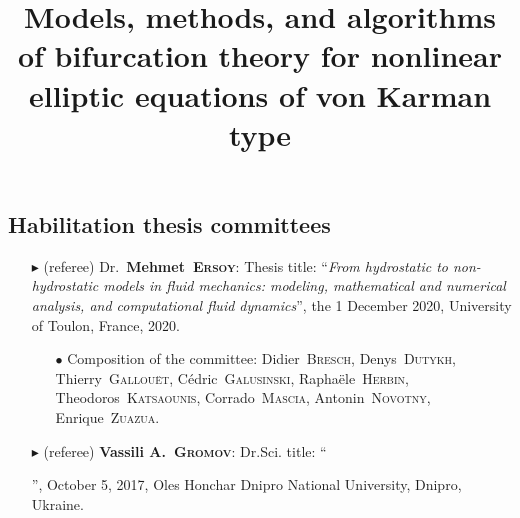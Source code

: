    \separator
    \subsection{Habilitation thesis committees}
    \begin{itemize}
        \item[$\blacktriangleright$] (referee) Dr.~\textbf{Mehmet~\textsc{Ersoy}}: Thesis title: ``\textit{From hydrostatic to non-hydrostatic models in fluid mechanics: modeling, mathematical and numerical analysis, and computational fluid dynamics}'', the 1 December 2020, University of Toulon, France, 2020.
        \begin{itemize}
            \item[$\bullet$] Composition of the committee: Didier~\textsc{Bresch}, Denys~\textsc{Dutykh}, Thierry~\textsc{Gallou\"et}, C\'edric~\textsc{Galusinski}, Rapha\"ele~\textsc{Herbin}, Theodoros~\textsc{Katsaounis}, Corrado~\textsc{Mascia}, Antonin~\textsc{Novotny}, Enrique~\textsc{Zuazua}.
        \end{itemize}
        \item[$\blacktriangleright$] (referee) \textbf{Vassili A.~\textsc{Gromov}}: Dr.Sci. title: ``\title{Models, methods, and algorithms of bifurcation theory for nonlinear elliptic equations of von Karman type}'', October 5, 2017, Oles Honchar Dnipro National University, Dnipro, Ukraine.
    \end{itemize}

    \separator
